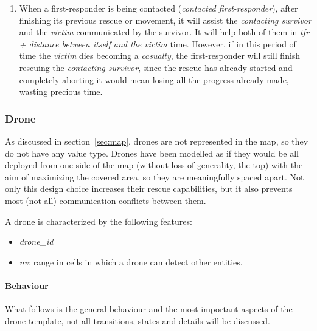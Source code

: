 \begin{enumerate}
	\item When a first-responder is being contacted (\textit{contacted first-responder}), after finishing its previous rescue or movement, it will assist the \textit{contacting survivor} and the \textit{victim} communicated by the survivor. It will help both of them in \textit{tfr + distance between itself and the victim} time. However, if in this period of time the \textit{victim} dies becoming a \textit{casualty}, the first-responder will still finish rescuing the \textit{contacting survivor}, since the rescue has already started and completely aborting it would mean losing all the progress already made, wasting precious time.
\end{enumerate}

\subsubsection{Drone}
\label{sec:drone}
As discussed in section~\ref{sec:map}, drones are not represented in the map, so they do not have any value type.\newline
Drones have been modelled as if they would be all deployed from one side of the map (without loss of generality, the top) with the aim of maximizing the covered area, so they are meaningfully spaced apart. Not only this design choice increases their rescue capabilities, but it also prevents most (not all) communication conflicts between them.\newline

\noindent
A drone is characterized by the following features:
\begin{itemize}
	\item \textit{drone\_id}
	\item \textit{nv}: range in cells in which a drone can detect other entities.
\end{itemize}

\paragraph{Behaviour}
What follows is the general behaviour and the most important aspects of the drone template, not all transitions, states and details will be discussed.\newline

